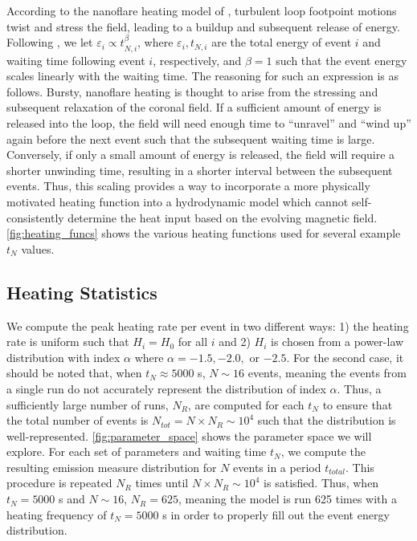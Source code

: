 \documentclass[preprint,linenumbers]{aastex}
\begin{document}
	\par According to the nanoflare heating model of \citet{parker_nanoflares_1988}, turbulent loop footpoint motions twist and stress the field, leading to a buildup and subsequent release of energy. Following \citet{cargill_active_2014}, we let $\varepsilon_i\propto t_{N,i}^{\beta}$, where $\varepsilon_i,t_{N,i}$ are the total energy of event $i$ and waiting time following event $i$, respectively, and $\beta=1$ such that the event energy scales linearly with the waiting time. The reasoning for such an expression is as follows. Bursty, nanoflare heating is thought to arise from the stressing and subsequent relaxation of the coronal field. If a sufficient amount of energy is released into the loop, the field will need enough time to ``unravel'' and ``wind up'' again before the next event such that the subsequent waiting time is large. Conversely, if only a small amount of energy is released, the field will require a shorter unwinding time, resulting in a shorter interval between the subsequent events. Thus, this scaling provides a way to incorporate a more physically motivated heating function into a hydrodynamic model which cannot self-consistently determine the heat input based on the evolving magnetic field. \autoref{fig:heating_funcs} shows the various heating functions used for several example $t_N$ values.
	\subsection{Heating Statistics}
	\label{subsec:heating_stats}
	\par We compute the peak heating rate per event in two different ways: 1) the heating rate is uniform such that $H_i=H_0$ for all $i$ and 2) $H_i$ is chosen from a power-law distribution with index $\alpha$ where $\alpha=-1.5,-2.0,$ or $-2.5$. For the second case, it should be noted that, when $t_N\approx5000$ s, $N\sim16$ events, meaning the events from a single run do not accurately represent the distribution of index $\alpha$. Thus, a sufficiently large number of runs, $N_{R}$, are computed for each $t_N$ to ensure that the total number of events is $N_{tot}=N\times N_{R}\sim10^4$ such that the distribution is well-represented. \autoref{fig:parameter_space} shows the parameter space we will explore. For each set of parameters and waiting time $t_N$, we compute the resulting emission measure distribution for $N$ events in a period $t_{total}$. This procedure is repeated $N_R$ times until $N\times N_R\sim10^4$ is satisfied. Thus, when $t_N=5000$ s and $N\sim16$, $N_R=625$, meaning the model is run 625 times with a heating frequency of $t_N=5000$ s in order to properly fill out the event energy distribution.
\end{document}
